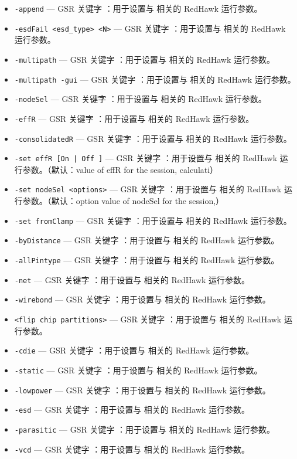 \begin{itemize}
\item \texttt{-append} — GSR 关键字 ：用于设置与  相关的 RedHawk 运行参数。
\item \texttt{-esdFail <esd\_type> <N>} — GSR 关键字 ：用于设置与  相关的 RedHawk 运行参数。
\item \texttt{-multipath} — GSR 关键字 ：用于设置与  相关的 RedHawk 运行参数。
\item \texttt{-multipath -gui} — GSR 关键字 ：用于设置与  相关的 RedHawk 运行参数。
\item \texttt{-nodeSel} — GSR 关键字 ：用于设置与  相关的 RedHawk 运行参数。
\item \texttt{-effR} — GSR 关键字 ：用于设置与  相关的 RedHawk 运行参数。
\item \texttt{-consolidatedR} — GSR 关键字 ：用于设置与  相关的 RedHawk 运行参数。
\item \texttt{-set effR [On | Off ]} — GSR 关键字 ：用于设置与  相关的 RedHawk 运行参数。（默认：value of effR for the session, calculati）
\item \texttt{-set nodeSel <options>} — GSR 关键字 ：用于设置与  相关的 RedHawk 运行参数。（默认：option value of nodeSel for the session,）
\item \texttt{-set fromClamp} — GSR 关键字 ：用于设置与  相关的 RedHawk 运行参数。
\item \texttt{-byDistance} — GSR 关键字 ：用于设置与  相关的 RedHawk 运行参数。
\item \texttt{-allPintype} — GSR 关键字 ：用于设置与  相关的 RedHawk 运行参数。
\item \texttt{-net} — GSR 关键字 ：用于设置与  相关的 RedHawk 运行参数。
\item \texttt{-wirebond} — GSR 关键字 ：用于设置与  相关的 RedHawk 运行参数。
\item \texttt{<flip chip partitions>} — GSR 关键字 ：用于设置与  相关的 RedHawk 运行参数。
\item \texttt{-cdie} — GSR 关键字 ：用于设置与  相关的 RedHawk 运行参数。
\item \texttt{-static} — GSR 关键字 ：用于设置与  相关的 RedHawk 运行参数。
\item \texttt{-lowpower} — GSR 关键字 ：用于设置与  相关的 RedHawk 运行参数。
\item \texttt{-esd} — GSR 关键字 ：用于设置与  相关的 RedHawk 运行参数。
\item \texttt{-parasitic} — GSR 关键字 ：用于设置与  相关的 RedHawk 运行参数。
\item \texttt{-vcd} — GSR 关键字 ：用于设置与  相关的 RedHawk 运行参数。

\end{itemize}
